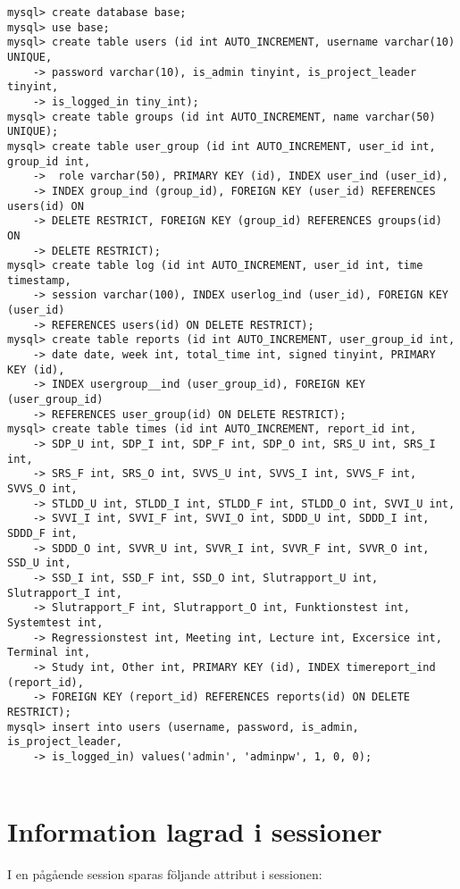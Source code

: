 \documentclass[a4paper]{article}
\begin{document}
\begin{lstlisting}
mysql> create database base;
mysql> use base;
mysql> create table users (id int AUTO_INCREMENT, username varchar(10) UNIQUE, 
    -> password varchar(10), is_admin tinyint, is_project_leader tinyint, 
    -> is_logged_in tiny_int);
mysql> create table groups (id int AUTO_INCREMENT, name varchar(50) UNIQUE);
mysql> create table user_group (id int AUTO_INCREMENT, user_id int, group_id int,
    ->  role varchar(50), PRIMARY KEY (id), INDEX user_ind (user_id), 
    -> INDEX group_ind (group_id), FOREIGN KEY (user_id) REFERENCES users(id) ON 
    -> DELETE RESTRICT, FOREIGN KEY (group_id) REFERENCES groups(id) ON 
    -> DELETE RESTRICT);
mysql> create table log (id int AUTO_INCREMENT, user_id int, time timestamp, 
    -> session varchar(100), INDEX userlog_ind (user_id), FOREIGN KEY (user_id) 
    -> REFERENCES users(id) ON DELETE RESTRICT);
mysql> create table reports (id int AUTO_INCREMENT, user_group_id int,
    -> date date, week int, total_time int, signed tinyint, PRIMARY KEY (id),
    -> INDEX usergroup__ind (user_group_id), FOREIGN KEY (user_group_id) 
    -> REFERENCES user_group(id) ON DELETE RESTRICT);
mysql> create table times (id int AUTO_INCREMENT, report_id int,
    -> SDP_U int, SDP_I int, SDP_F int, SDP_O int, SRS_U int, SRS_I int,
    -> SRS_F int, SRS_O int, SVVS_U int, SVVS_I int, SVVS_F int, SVVS_O int,
    -> STLDD_U int, STLDD_I int, STLDD_F int, STLDD_O int, SVVI_U int,
    -> SVVI_I int, SVVI_F int, SVVI_O int, SDDD_U int, SDDD_I int, SDDD_F int,
    -> SDDD_O int, SVVR_U int, SVVR_I int, SVVR_F int, SVVR_O int, SSD_U int,
    -> SSD_I int, SSD_F int, SSD_O int, Slutrapport_U int, Slutrapport_I int,
    -> Slutrapport_F int, Slutrapport_O int, Funktionstest int, Systemtest int,
    -> Regressionstest int, Meeting int, Lecture int, Excersice int, Terminal int,
    -> Study int, Other int, PRIMARY KEY (id), INDEX timereport_ind (report_id),
    -> FOREIGN KEY (report_id) REFERENCES reports(id) ON DELETE RESTRICT);
mysql> insert into users (username, password, is_admin, is_project_leader, 
    -> is_logged_in) values('admin', 'adminpw', 1, 0, 0);


\end{lstlisting}


\section{Information lagrad i sessioner}
I en pågående session sparas följande attribut i sessionen:
\end{document}
